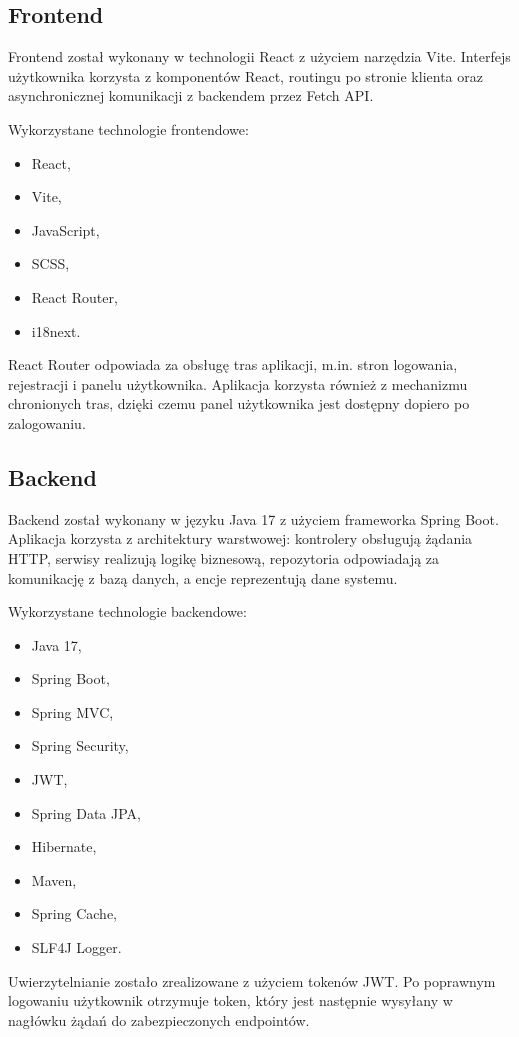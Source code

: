 \documentclass[12pt,a4paper]{article}
\begin{document}
\subsection{Frontend}

Frontend został wykonany w technologii React z użyciem narzędzia Vite. Interfejs użytkownika korzysta z komponentów React, routingu po stronie klienta oraz asynchronicznej komunikacji z backendem przez Fetch API.

Wykorzystane technologie frontendowe:
\begin{itemize}
\item React,
\item Vite,
\item JavaScript,
\item SCSS,
\item React Router,
\item i18next.
\end{itemize}

React Router odpowiada za obsługę tras aplikacji, m.in. stron logowania, rejestracji i panelu użytkownika. Aplikacja korzysta również z mechanizmu chronionych tras, dzięki czemu panel użytkownika jest dostępny dopiero po zalogowaniu.

\subsection{Backend}

Backend został wykonany w języku Java 17 z użyciem frameworka Spring Boot. Aplikacja korzysta z architektury warstwowej: kontrolery obsługują żądania HTTP, serwisy realizują logikę biznesową, repozytoria odpowiadają za komunikację z bazą danych, a encje reprezentują dane systemu.

Wykorzystane technologie backendowe:
\begin{itemize}
\item Java 17,
\item Spring Boot,
\item Spring MVC,
\item Spring Security,
\item JWT,
\item Spring Data JPA,
\item Hibernate,
\item Maven,
\item Spring Cache,
\item SLF4J Logger.
\end{itemize}

Uwierzytelnianie zostało zrealizowane z użyciem tokenów JWT. Po poprawnym logowaniu użytkownik otrzymuje token, który jest następnie wysyłany w nagłówku żądań do zabezpieczonych endpointów.
\end{document}
